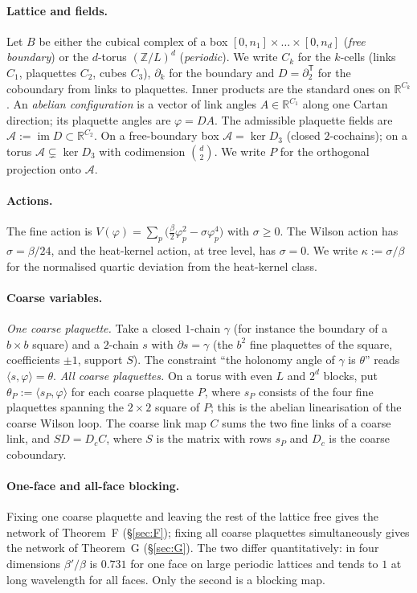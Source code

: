 \documentclass[11pt,a4paper]{article}
\theoremstyle{definition}
\theoremstyle{remark}
\newcommand{\R}{\mathbb{R}}
\newcommand{\cA}{\mathcal{A}}
\newcommand{\im}{\operatorname{im}}
\begin{document}
\paragraph{Lattice and fields.}
Let $B$ be either the cubical complex of a box $[0,n_1]\times\dots\times[0,n_d]$ (\emph{free boundary}) or the $d$-torus $(\mathbb{Z}/L)^d$ (\emph{periodic}).
We write $C_k$ for the $k$-cells (links $C_1$, plaquettes $C_2$, cubes $C_3$), $\partial_k$ for the boundary and $D=\partial_2^{\mathsf T}$ for the coboundary from links to plaquettes.
Inner products are the standard ones on $\R^{C_k}$.
An \emph{abelian configuration} is a vector of link angles $A\in\R^{C_1}$ along one Cartan direction; its plaquette angles are $\varphi=DA$.
The admissible plaquette fields are $\cA:=\im D\subset\R^{C_2}$.
On a free-boundary box $\cA=\ker D_3$ (closed $2$-cochains); on a torus $\cA\subsetneq\ker D_3$ with codimension $\binom d2$.
We write $P$ for the orthogonal projection onto $\cA$.

\paragraph{Actions.}
The fine action is $V(\varphi)=\sum_p\bigl(\frac\beta2\varphi_p^2-\sigma\varphi_p^4\bigr)$ with $\sigma\ge0$.
The Wilson action has $\sigma=\beta/24$, and the heat-kernel action, at tree level, has $\sigma=0$.
We write $\kappa:=\sigma/\beta$ for the normalised quartic deviation from the heat-kernel class.

\paragraph{Coarse variables.}
\emph{One coarse plaquette.} Take a closed $1$-chain $\gamma$ (for instance the boundary of a $b\times b$ square) and a $2$-chain $s$ with $\partial s=\gamma$ (the $b^2$ fine plaquettes of the square, coefficients $\pm1$, support $S$). The constraint ``the holonomy angle of $\gamma$ is $\theta$'' reads $\langle s,\varphi\rangle=\theta$.
\emph{All coarse plaquettes.} On a torus with even $L$ and $2^d$ blocks, put $\theta_P:=\langle s_P,\varphi\rangle$ for each coarse plaquette $P$, where $s_P$ consists of the four fine plaquettes spanning the $2\times2$ square of $P$; this is the abelian linearisation of the coarse Wilson loop.
The coarse link map $C$ sums the two fine links of a coarse link, and $SD=D_cC$, where $S$ is the matrix with rows $s_P$ and $D_c$ is the coarse coboundary.

\paragraph{One-face and all-face blocking.}
Fixing one coarse plaquette and leaving the rest of the lattice free gives the network of Theorem~F (\S\ref{sec:F}); fixing all coarse plaquettes simultaneously gives the network of Theorem~G (\S\ref{sec:G}).
The two differ quantitatively: in four dimensions $\beta'/\beta$ is $0.731$ for one face on large periodic lattices and tends to $1$ at long wavelength for all faces.
Only the second is a blocking map.
\end{document}
